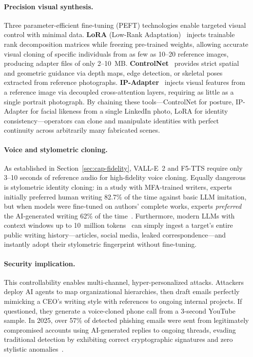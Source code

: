 \paragraph{Precision visual synthesis.}
Three parameter-efficient fine-tuning (PEFT) technologies enable targeted visual control with minimal data. \textbf{LoRA} (Low-Rank Adaptation)~\cite{hu2022lora} injects trainable rank decomposition matrices while freezing pre-trained weights, allowing accurate visual cloning of specific individuals from as few as 10--20 reference images, producing adapter files of only 2--10~MB. \textbf{ControlNet}~\cite{zhang2023controlnet} provides strict spatial and geometric guidance via depth maps, edge detection, or skeletal poses extracted from reference photographs. \textbf{IP-Adapter}~\cite{ye2023ipadapter} injects visual features from a reference image via decoupled cross-attention layers, requiring as little as a single portrait photograph. By chaining these tools---ControlNet for posture, IP-Adapter for facial likeness from a single LinkedIn photo, LoRA for identity consistency---operators can clone and manipulate identities with perfect continuity across arbitrarily many fabricated scenes.

\paragraph{Voice and stylometric cloning.}
As established in Section~\ref{sec:cap-fidelity}, VALL-E~2 and F5-TTS require only 3--10 seconds of reference audio for high-fidelity voice cloning. Equally dangerous is stylometric identity cloning: in a study with MFA-trained writers, experts initially preferred human writing 82.7\% of the time against basic LLM imitation, but when models were fine-tuned on authors' complete works, experts \emph{preferred} the AI-generated writing 62\% of the time~\cite{chi2026creative}. Furthermore, modern LLMs with context windows up to 10~million tokens~\cite{llama4} can simply ingest a target's entire public writing history---articles, social media, leaked correspondence---and instantly adopt their stylometric fingerprint without fine-tuning.

\paragraph{Security implication.}
This controllability enables multi-channel, hyper-personalized attacks. Attackers deploy AI agents to map organizational hierarchies, then draft emails perfectly mimicking a CEO's writing style with references to ongoing internal projects. If questioned, they generate a voice-cloned phone call from a 3-second YouTube sample. In 2025, over 57\% of detected phishing emails were sent from legitimately compromised accounts using AI-generated replies to ongoing threads, evading traditional detection by exhibiting correct cryptographic signatures and zero stylistic anomalies~\cite{zensec2025phishing}.


